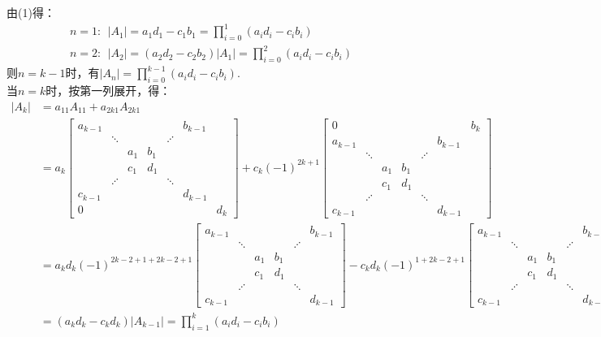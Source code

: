 \documentclass{article}
\begin{document}
\begin{jie}
由(1)得：
\begin{gather*}
n=1:~~\left|A_ {1}\right|=a_{1}d_{1}-c_{1}b_{1}=\prod\limits_{i=0}^{1}(a_{i}d_{i}-c_{i}b_{i})\\
n=2:~~\left|A_ {2}\right|=(a_{2}d_{2}-c_{2}b_{2})\left|A_ {1}\right|=\prod\limits_{i=0}^{2}(a_{i}d_{i}-c_{i}b_{i})
\end{gather*}
则$n=k-1$时，有$|A_{n}|=\prod\limits_{i=0}^{k-1}(a_{i}d_{i}-c_{i}b_{i})$.\\
当$n=k$时，按第一列展开，得：
\begin{align*}
\left|A_ {k}\right|&=a_{11}A_{11}+a_{2k1}A_{2k1}\\
&=a_{k}\begin{bmatrix}
  a_{k-1}  & ~ & ~ & ~ & ~ & b_{k-1} & ~\\
   ~ & \ddots & ~ & ~ & \iddots  & ~ & ~\\
   ~ & ~ & a_{1}&b_{1} & ~ & ~ & ~\\
  ~ & ~ & c_{1}&d_{1} & ~ & ~ & ~\\
   ~ & \iddots & ~ & ~ & \ddots  & ~ & ~\\
   c_{k-1}  & ~ & ~ & ~ & ~ & d_{k-1} & ~\\
   0  & ~ & ~ & ~ & ~ & ~ & d_{k}
\end{bmatrix}+c_{k}(-1)^{2k+1}
\begin{bmatrix}
  0  & ~ & ~ & ~ & ~ & ~ & b_{k}\\
   a_{k-1}  & ~ & ~ & ~ & ~ & b_{k-1} & ~\\
   ~ & \ddots & ~ & ~ & \iddots  & ~ & ~\\
   ~ & ~ & a_{1}&b_{1} & ~ & ~ & ~\\
  ~ & ~ & c_{1}&d_{1} & ~ & ~ & ~\\
   ~ & \iddots & ~ & ~ & \ddots  & ~ & ~\\
   c_{k-1}  & ~ & ~ & ~ & ~ & d_{k-1} & ~
\end{bmatrix}\\
&=a_{k}d_{k}(-1)^{2k-2+1+2k-2+1}\begin{bmatrix}
  a_{k-1}  & ~ & ~ & ~ & ~ & b_{k-1} \\
   ~ & \ddots & ~ & ~ & \iddots  & ~ \\
   ~ & ~ & a_{1}&b_{1} & ~ & ~ \\
  ~ & ~ & c_{1}&d_{1} & ~ & ~ \\
   ~ & \iddots & ~ & ~ & \ddots  & ~ \\
   c_{k-1}  & ~ & ~ & ~ & ~ & d_{k-1}
\end{bmatrix}-c_{k}d_{k}(-1)^{1+2k-2+1}\begin{bmatrix}
  a_{k-1}  & ~ & ~ & ~ & ~ & b_{k-1} \\
   ~ & \ddots & ~ & ~ & \iddots  & ~ \\
   ~ & ~ & a_{1}&b_{1} & ~ & ~ \\
  ~ & ~ & c_{1}&d_{1} & ~ & ~ \\
   ~ & \iddots & ~ & ~ & \ddots  & ~ \\
   c_{k-1}  & ~ & ~ & ~ & ~ & d_{k-1}
\end{bmatrix}\\ &=(a_{k}d_{k}-c_{k}d_{k})|A_{k-1}|=\prod_{i=1}^{k}(a_{i}d_{i}-c_{i}b_{i})
\end{align*}
\end{jie}
\end{document}
